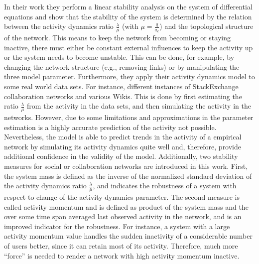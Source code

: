 In their work they perform a linear stability analysis on the system of differential equations and show that the stability of the system is determined by the relation between the activity dynamics ratio \( \frac{\lambda}{\mu} \) (with \( \mu = \frac{q}{a_{c}} \)) and the topological structure of the network.
This means to keep the network from becoming or staying inactive, there must either be constant external influences to keep the activity up or the system needs to become unstable.
This can be done, for example, by changing the network structure (e.g., removing links) or by manipulating the three model parameter.
Furthermore, they apply their activity dynamics model to some real world data sets.
For instance, different instances of StackExchange collaboration networks and various Wikis.
This is done by first estimating the ratio \( \frac{\lambda}{\mu} \) from the activity in the data sets, and then simulating the activity in the networks.
However, due to some limitations and approximations in the parameter estimation is a highly accurate prediction of the activity not possible.
Nevertheless, the model is able to predict trends in the activity of a empirical network by simulating its activity dynamics quite well and, therefore, provide additional confidence in the validity of the model.
Additionally, two stability measures for social or collaboration networks are introduced in this work.
First, the system mass is defined as the inverse of the normalized standard deviation of the activity dynamics ratio \( \frac{\lambda}{\mu} \), and indicates the robustness of a system with respect to change of the activity dynamics parameter.
The second measure is called activity momentum and is defined as product of the system mass and the over some time span averaged last observed activity in the network, and is an improved indicator for the robustness.
For instance, a system with a large activity momentum value handles the sudden inactivity of a considerable number of users better, since it can retain most of its activity.
Therefore, much more \enquote{force} is needed to render a network with high activity momentum inactive.

